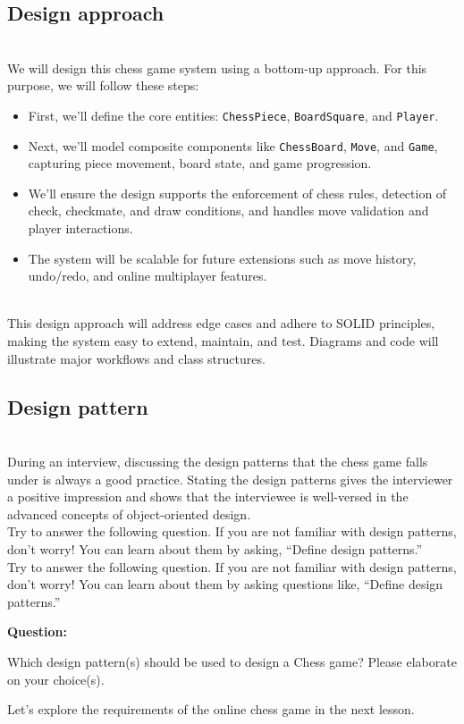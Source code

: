 \subsection{Design approach}\label{IaKKBorxmgqQpfrscU7Zo}
\\
We will design this chess game system using a bottom-up approach. For this purpose, we will follow these steps:

\begin{itemize}
\item
\protect{}\label{cqs1Io1erPWIAu1CHwTrP}
First, we'll define the core entities: \texttt{ChessPiece}, \texttt{BoardSquare}, and \texttt{Player}.
\item
\protect{}\label{U9Yy0WNcAe7fZl50kjqHC}
Next, we'll model composite components like \texttt{ChessBoard}, \texttt{Move}, and \texttt{Game}, capturing piece movement, board state, and game progression.
\item
\protect{}\label{qGc4U5I8P61weUYiD-kBP}
We'll ensure the design supports the enforcement of chess rules, detection of check, checkmate, and draw conditions, and handles move validation and player interactions.
\item
\protect{}\label{OpcMlGXbe8jmdWAjjn5O6}
The system will be scalable for future extensions such as move history, undo/redo, and online multiplayer features.
\end{itemize}
\\
This design approach will address edge cases and adhere to SOLID principles, making the system easy to extend, maintain, and test. Diagrams and code will illustrate major workflows and class structures.

\subsection{Design pattern~}\label{CmVqJxULuf2M9UtshDr-H}
\\
During an interview, discussing the design patterns that the chess game falls under is always a good practice. Stating the design patterns gives the interviewer a positive impression and shows that the interviewee is well-versed in the advanced concepts of object-oriented design.
\\
Try to answer the following question. If you are not familiar with design patterns, don't worry! You can learn about them by asking, ``Define design patterns.''
\\
Try to answer the following question. If you are not familiar with design patterns, don't worry! You can learn about them by asking questions like, ``Define design patterns.''

\textbf{Question:}

Which design pattern(s) should be used to design a Chess game? Please elaborate on your choice(s).

Let's explore the requirements of the online chess game in the next lesson.

